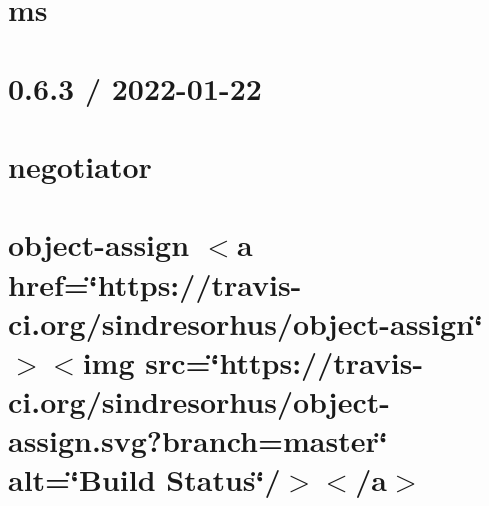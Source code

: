 \documentclass[twoside]{book}
\newcommand{\+}{\discretionary{\mbox{\scriptsize$\hookleftarrow$}}{}{}}
\begin{document}
\chapter{ms}
\label{md__c___users_vaishnavi_jadhav__desktop__developer_code_mean_stack_example_server_node_modules_ms_readme}

\chapter{0.6.3 / 2022-\/01-\/22}
\label{md__c___users_vaishnavi_jadhav__desktop__developer_code_mean_stack_example_server_node_modules_negotiator__h_i_s_t_o_r_y}

\chapter{negotiator}
\label{md__c___users_vaishnavi_jadhav__desktop__developer_code_mean_stack_example_server_node_modules_negotiator__r_e_a_d_m_e}

\chapter{object-\/assign \texorpdfstring{$<$}{<}a href=\char`\"{}https\+://travis-\/ci.\+org/sindresorhus/object-\/assign\char`\"{} \texorpdfstring{$>$}{>}\texorpdfstring{$<$}{<}img src=\char`\"{}https\+://travis-\/ci.\+org/sindresorhus/object-\/assign.\+svg?branch=master\char`\"{} alt=\char`\"{}\+Build Status\char`\"{}/\texorpdfstring{$>$}{>}\texorpdfstring{$<$}{<}/a\texorpdfstring{$>$}{>}}
\label{md__c___users_vaishnavi_jadhav__desktop__developer_code_mean_stack_example_server_node_modules_object_assign_readme}

\end{document}
